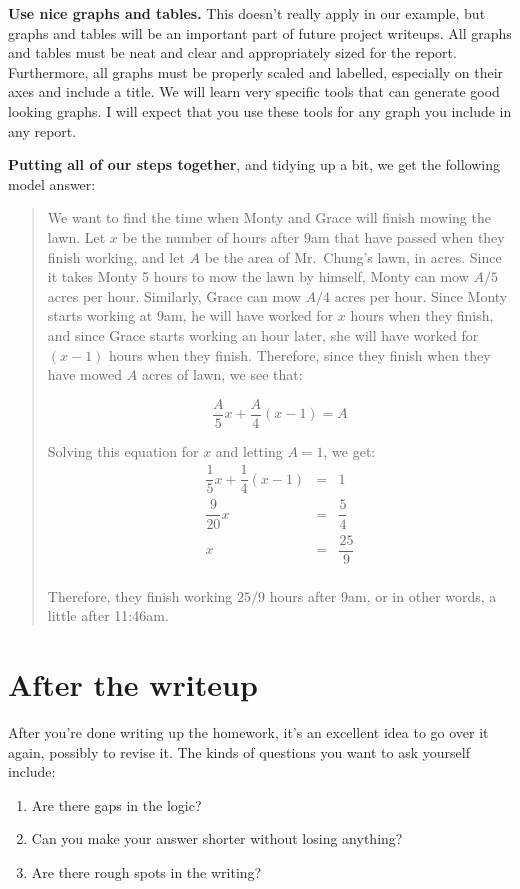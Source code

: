 \documentclass{article}
\begin{document}
\textbf{Use nice graphs and tables.} This doesn't really apply in our example, but graphs and tables will be an important part of future project writeups. All graphs and tables must be neat and clear and appropriately sized for the report. Furthermore, all graphs must be properly scaled and labelled, especially on their axes and include a title. We will learn very specific tools that can generate good looking graphs. I will expect that you use these tools for any graph you include in any report.

\textbf{Putting all of our steps together}, and tidying up a bit, we get the following model answer:

\begin{quote}
We want to find the time when Monty and Grace will finish mowing the lawn. Let $x$ be the number of hours after 9am that have passed when they finish working, and let $A$ be the area of Mr.\ Chung's lawn, in acres. Since it takes Monty 5 hours to mow the lawn by himself, Monty can mow $A/5$ acres per hour. Similarly, Grace can mow $A/4$ acres per hour. Since Monty starts working at 9am, he will have worked for $x$ hours when they finish, and since Grace starts working an hour later, she will have worked for $(x-1)$ hours when they finish. Therefore, since they finish when they have mowed $A$ acres of lawn, we see that:

\[
	\dfrac{A}{5}x + \dfrac{A}{4}(x-1) = A
\]

Solving this equation for $x$ and letting $A=1$, we get:
\begin{eqnarray*}
	\dfrac{1}{5}x + \dfrac{1}{4}(x-1) &=& 1 \\
	\dfrac{9}{20}x &=& \dfrac{5}{4} \\
	x &=& \dfrac{25}{9} \\
\end{eqnarray*}

Therefore, they finish working $25/9$ hours after 9am, or in other words, a little after 11:46am.
\end{quote}

\section*{After the writeup}

After you're done writing up the homework, it's an excellent idea to go over it again, possibly to revise it. The kinds of questions you want to ask yourself include:
\begin{enumerate}
\item Are there gaps in the logic?
\item Can you make your answer shorter without losing anything?
\item Are there rough spots in the writing?
\end{enumerate}
\end{document}
